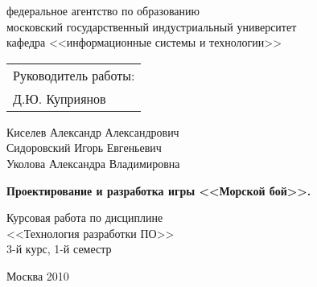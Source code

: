 ﻿\thispagestyle{empty}

\vspace*{-\headheight}\vspace*{-\headsep}

{\centering
{\sc
федеральное агентство по образованию\\
московский государственный индустриальный университет\\
кафедра <<информационные системы и технологии>>\\
}


\vspace{4cm plus 1mm minus 1mm}

\begin{flushright}
\begin{tabular}{l}
Руководитель работы:\\
Д.Ю. Куприянов
\end{tabular}
\end{flushright}

\vspace{3cm plus 1mm minus 1mm}

Киселев Александр Александрович\\
Сидоровский Игорь Евгеньевич\\
Уколова Александра Владимировна

\vspace{1cm plus 1mm minus 1mm}
{\large\bf
Проектирование и разработка игры <<Морской бой>>.
}

\vspace{1cm plus 1mm minus 1mm}

Курсовая работа по дисциплине\\
<<Технология разработки ПО>>\\
3-й курс, 1-й семестр

\vfill

Москва 2010

}

\newpage
\endinput


